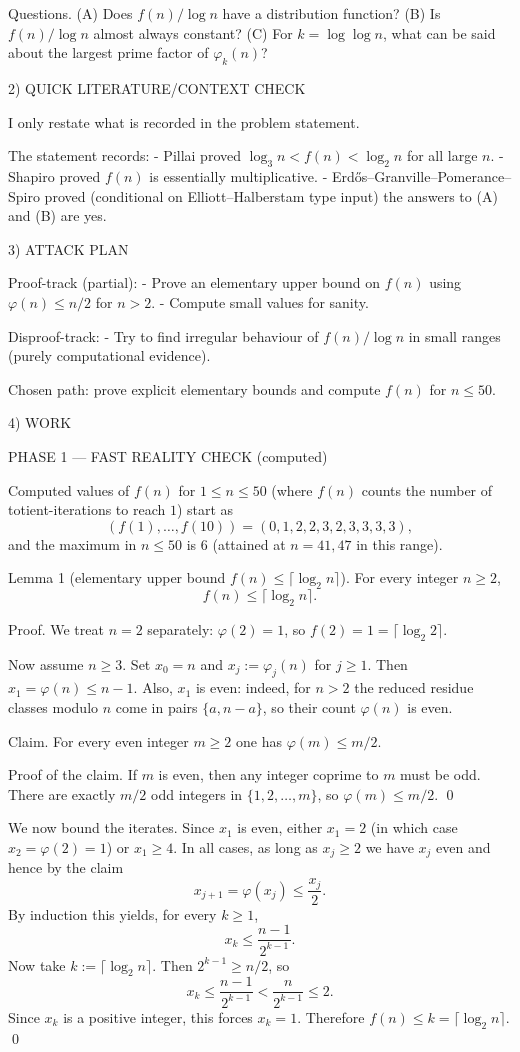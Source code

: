 Questions.
(A) Does $f(n)/\log n$ have a distribution function?
(B) Is $f(n)/\log n$ almost always constant?
(C) For $k=\log\log n$, what can be said about the largest prime factor of $\varphi_k(n)$?

2) QUICK LITERATURE/CONTEXT CHECK

I only restate what is recorded in the problem statement.

The statement records:
- Pillai proved $\log_3 n < f(n) < \log_2 n$ for all large $n$.
- Shapiro proved $f(n)$ is essentially multiplicative.
- Erd\H{o}s--Granville--Pomerance--Spiro proved (conditional on Elliott--Halberstam type input) the answers to (A) and (B) are yes.

3) ATTACK PLAN

Proof-track (partial):
- Prove an elementary upper bound on $f(n)$ using $\varphi(n)\le n/2$ for $n>2$.
- Compute small values for sanity.

Disproof-track:
- Try to find irregular behaviour of $f(n)/\log n$ in small ranges (purely computational evidence).

Chosen path: prove explicit elementary bounds and compute $f(n)$ for $n\le 50$.

4) WORK

PHASE 1 — FAST REALITY CHECK (computed)

Computed values of $f(n)$ for $1\le n\le 50$ (where $f(n)$ counts the number of totient-iterations to reach $1$) start as
\[
( f(1),\dots,f(10))=(0,1,2,2,3,2,3,3,3,3),
\]
and the maximum in $n\le 50$ is $6$ (attained at $n=41,47$ in this range).

Lemma 1 (elementary upper bound $f(n)\le \lceil\log_2 n\rceil$).
For every integer $n\ge 2$,
\[
 f(n)\le \lceil\log_2 n\rceil.
\]

Proof.
We treat $n=2$ separately: $\varphi(2)=1$, so $f(2)=1=\lceil\log_2 2\rceil$.

Now assume $n\ge 3$.
Set $x_0=n$ and $x_j:=\varphi_j(n)$ for $j\ge 1$.
Then $x_1=\varphi(n)\le n-1$.
Also, $x_1$ is even: indeed, for $n>2$ the reduced residue classes modulo $n$ come in pairs $\{a,n-a\}$, so their count $\varphi(n)$ is even.

Claim.
For every even integer $m\ge 2$ one has $\varphi(m)\le m/2$.

Proof of the claim.
If $m$ is even, then any integer coprime to $m$ must be odd. There are exactly $m/2$ odd integers in $\{1,2,\dots,m\}$, so $\varphi(m)\le m/2$. \qed

We now bound the iterates.
Since $x_1$ is even, either $x_1=2$ (in which case $x_2=\varphi(2)=1$) or $x_1\ge 4$.
In all cases, as long as $x_j\ge 2$ we have $x_j$ even and hence by the claim
\[
 x_{j+1}=\varphi(x_j)\le \frac{x_j}{2}.
\]
By induction this yields, for every $k\ge 1$,
\[
 x_k\le \frac{n-1}{2^{k-1}}.
\]
Now take $k:=\lceil\log_2 n\rceil$.
Then $2^{k-1}\ge n/2$, so
\[
 x_k\le \frac{n-1}{2^{k-1}} < \frac{n}{2^{k-1}}\le 2.
\]
Since $x_k$ is a positive integer, this forces $x_k=1$.
Therefore $f(n)\le k=\lceil\log_2 n\rceil$. \qed

